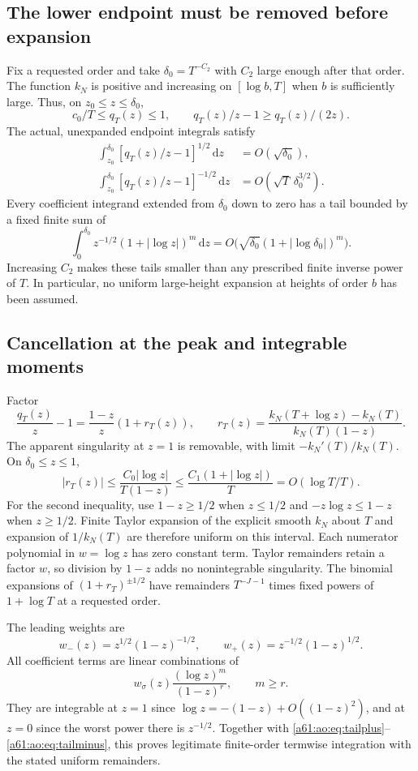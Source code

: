 \documentclass[11pt,letterpaper]{article}
\numberwithin{equation}{section}
\theoremstyle{remark}\newtheorem{remark}[theorem]{Remark}
\newcommand{\dd}{\,\mathrm d}
\begin{document}
\subsection{The lower endpoint must be removed before expansion}
Fix a requested order and take $\delta_0=T^{-C_2}$ with $C_2$ large
enough after that order. The function $k_N$ is positive and increasing
on $[\log b,T]$ when $b$ is sufficiently large. Thus, on
$z_0\le z\le\delta_0$,
\[
 c_0/T\le q_T(z)\le1,\qquad
 q_T(z)/z-1\ge q_T(z)/(2z).
\]
The actual, unexpanded endpoint integrals satisfy
\begin{align}
 \int_{z_0}^{\delta_0}[q_T(z)/z-1]^{1/2}\dd z
 &=O(\sqrt{\delta_0}),\label{a61:ao:eq:tailplus}\\
 \int_{z_0}^{\delta_0}[q_T(z)/z-1]^{-1/2}\dd z
 &=O(\sqrt T\,\delta_0^{3/2}).\label{a61:ao:eq:tailminus}
\end{align}
Every coefficient integrand extended from $\delta_0$ down to zero
has a tail bounded by a fixed finite sum of
\[
 \int_0^{\delta_0}z^{-1/2}(1+|\log z|)^m\dd z
 =O\bigl(\sqrt{\delta_0}(1+|\log\delta_0|)^m\bigr).
\]
Increasing $C_2$ makes these tails smaller than any prescribed finite
inverse power of $T$. In particular, no uniform large-height
expansion at heights of order $b$ has been assumed.

\subsection{Cancellation at the peak and integrable moments}
Factor
\begin{equation}\label{a61:ao:eq:removable}
 \frac{q_T(z)}z-1=\frac{1-z}z(1+r_T(z)),\qquad
 r_T(z)=\frac{k_N(T+\log z)-k_N(T)}{k_N(T)(1-z)}.
\end{equation}
The apparent singularity at $z=1$ is removable, with limit
$-k_N'(T)/k_N(T)$. On $\delta_0\le z\le1$,
\[
 |r_T(z)|\le\frac{C_0|\log z|}{T(1-z)}
 \le\frac{C_1(1+|\log z|)}T
 =O(\log T/T).
\]
For the second inequality, use $1-z\ge1/2$ when $z\le1/2$ and
$-z\log z\le1-z$ when $z\ge1/2$. Finite Taylor expansion of the
explicit smooth $k_N$ about $T$ and expansion of $1/k_N(T)$ are
therefore uniform on this interval. Each numerator polynomial in
$w=\log z$ has zero constant term. Taylor remainders retain a factor
$w$, so division by $1-z$ adds no nonintegrable singularity.
The binomial expansions of $(1+r_T)^{\pm1/2}$ have remainders
$T^{-J-1}$ times fixed powers of $1+\log T$ at a requested order.

The leading weights are
\[
 w_-(z)=z^{1/2}(1-z)^{-1/2},\qquad
 w_+(z)=z^{-1/2}(1-z)^{1/2}.
\]
All coefficient terms are linear combinations of
\begin{equation}\label{a61:ao:eq:momentintegrand}
 w_\sigma(z)\frac{(\log z)^m}{(1-z)^r},\qquad m\ge r.
\end{equation}
They are integrable at $z=1$ since $\log z=-(1-z)+O((1-z)^2)$,
and at $z=0$ since the worst power there is $z^{-1/2}$. Together with
\eqref{a61:ao:eq:tailplus}--\eqref{a61:ao:eq:tailminus}, this proves legitimate
finite-order termwise integration with the stated uniform remainders.
\end{document}
